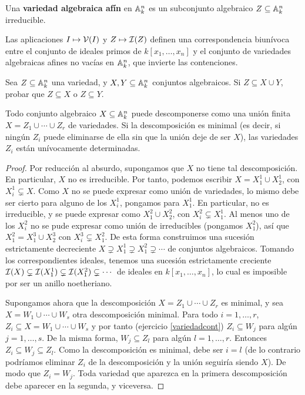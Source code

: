 \documentclass[ACGA.tex]{subfiles}
\begin{document}
\begin{defi}
 Una {\bf variedad algebraica afín} en $\mathbb{A}^n_k$ es un subconjunto algebraico $Z\subseteq\mathbb{A}^n_k$ irreducible.
\end{defi}

\begin{coro}
  Las aplicaciones $I\mapsto \mathcal{V}(I)$ y $Z\mapsto \mathcal{I}(Z)$ definen una correspondencia biunívoca entre el conjunto de ideales primos de $k[x_1,\ldots,x_n]$ y el conjunto de variedades algebraicas afines no vacías en $\mathbb{A}^n_k$, que invierte las contenciones. 
  
\end{coro}

\begin{ejer}\label{variedadcont}
 Sea $Z\subseteq\mathbb{A}^n_k$ una variedad, y $X,Y\subseteq\mathbb{A}^n_k$ conjuntos algebraicos. Si $Z\subseteq X\cup Y$, probar que $Z\subseteq X$ o $Z\subseteq Y$.
\end{ejer}


\begin{prop}
 Todo conjunto algebraico $X\subseteq \mathbb{A}^n_k$ puede descomponerse como una unión finita $X=Z_1\cup\cdots\cup Z_r$ de variedades. Si la descomposición es minimal (es decir, si ningún $Z_i$ puede eliminarse de ella sin que la unión deje de ser $X$), las variedades $Z_i$ están unívocamente determinadas.
\end{prop}

\begin{proof}
 Por reducción al absurdo, supongamos que $X$ no tiene tal descomposición. En particular, $X$ no es irreducible. Por tanto, podemos escribir $X=X^1_1\cup X^1_2$, con $X^1_i\subsetneq X$. Como $X$ no se puede expresar como unión de variedades, lo mismo debe ser cierto para alguno de los $X^1_i$, pongamos para $X^1_1$. En particular, no es irreducible, y se puede expresar como $X^2_1\cup X^2_2$, con $X^2_i\subsetneq X^1_1$. Al menos uno de los $X^2_i$ no se pude expresar como unión de irreducibles (pongamos $X^2_1$), así que $X^2_1=X^3_1\cup X^3_2$ con $X^3_i\subsetneq X^2_1$. De esta forma construimos una sucesión estrictamente decreciente $X\supsetneq X^1_1\supsetneq X^2_1\supsetneq\cdots$ de conjuntos algebraicos. Tomando los correspondientes ideales, tenemos una sucesión estrictamente creciente $\mathcal{I}(X)\subsetneq \mathcal{I}(X^1_1)\subsetneq\mathcal{I}(X^2_1)\subsetneq\cdots$ de ideales en $k[x_1,\ldots,x_n]$, lo cual es imposible por ser un anillo noetheriano.

Supongamos ahora que la descomposición $X=Z_1\cup\cdots\cup Z_r$ es minimal, y sea $X=W_1\cup\cdots\cup W_s$ otra descomposición minimal. Para todo $i=1,\ldots,r$, $Z_i\subseteq X=W_1\cup\cdots\cup W_s$ y por tanto (ejercicio \ref{variedadcont}) $Z_i\subseteq W_j$ para algún $j=1,\ldots,s$. De la misma forma, $W_j\subseteq Z_l$ para algún $l=1,\ldots,r$. Entonces $Z_i\subseteq W_j\subseteq Z_l$. Como la descomposición es minimal, debe ser $i=l$ (de lo contrario podríamos eliminar $Z_i$ de la descomposición y la unión seguiría siendo $X$). De modo que $Z_i=W_j$. Toda variedad que aparezca en la primera descomposición debe aparecer en la segunda, y viceversa.
\end{proof}
\end{document}
